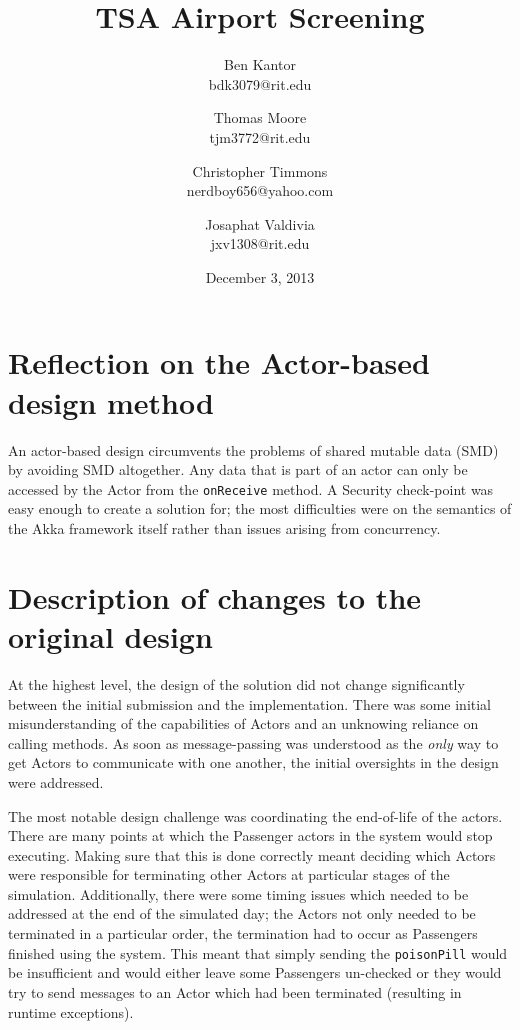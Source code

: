 \documentclass[12pt,letterpaper]{scrartcl}
\title{TSA Airport Screening}
\author{
    Ben Kantor \\
    bdk3079@rit.edu
    \and
    Thomas Moore \\
    tjm3772@rit.edu
    \and
    Christopher Timmons \\
    nerdboy656@yahoo.com
    \and
    Josaphat Valdivia \\
    jxv1308@rit.edu
}
\date{December 3, 2013}
\begin{document}
\maketitle %

\section{Reflection on the Actor-based design method}
An actor-based design circumvents the problems of shared mutable data (SMD) by avoiding SMD altogether.
Any data that is part of an actor can only be accessed by the Actor from the \texttt{onReceive} method.
A Security check-point was easy enough to create a solution for;
the most difficulties were on the semantics of the Akka framework itself rather than issues arising from concurrency.

\section{Description of changes to the original design}
At the highest level, the design of the solution did not change significantly between the initial submission and the implementation.
There was some initial misunderstanding of the capabilities of Actors and an unknowing reliance on calling methods.
As soon as message-passing was understood as the \emph{only} way to get Actors to communicate with one another, the initial oversights in the design were addressed.

The most notable design challenge was coordinating the end-of-life of the actors.
There are many points at which the Passenger actors in the system would stop executing.
Making sure that this is done correctly meant deciding which Actors were responsible for terminating other Actors at particular stages of the simulation.
Additionally, there were some timing issues which needed to be addressed at the end of the simulated day;
the Actors not only needed to be terminated in a particular order, the termination had to occur as Passengers finished using the system.
This meant that simply sending the \texttt{poisonPill} would be insufficient and would either leave some Passengers un-checked or they would try to send messages to an Actor which had been terminated (resulting in runtime exceptions).
\end{document}
